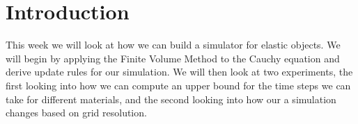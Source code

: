 \section{Introduction}
This week we will look at how we can build a simulator for elastic objects. We will begin by applying the Finite Volume Method to the Cauchy equation and derive update rules for our simulation. We will then look at two experiments, the first looking into how we can compute an upper bound for the time steps we can take for different materials, and the second looking into how our a simulation changes based on grid resolution.